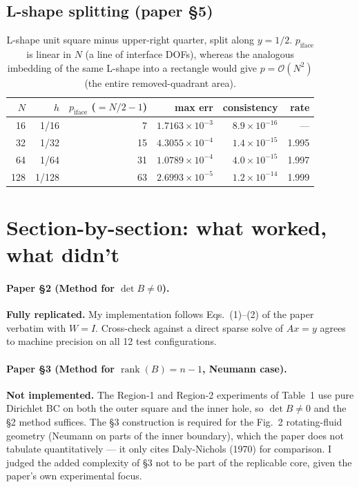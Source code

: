 \documentclass[11pt]{article}
\begin{document}
\subsection{L-shape splitting (paper \S5)}

\begin{table}[h]
\centering
\small
\begin{tabular}{rrrrrr}
\toprule
$N$ & $h$ & $p_{\text{iface}}$ ($ = N/2-1$) & max err & consistency & rate \\
\midrule
16  & 1/16 &  7 & $1.7163\times10^{-3}$ & $8.9\times10^{-16}$ & --- \\
32  & 1/32 & 15 & $4.3055\times10^{-4}$ & $1.4\times10^{-15}$ & 1.995 \\
64  & 1/64 & 31 & $1.0789\times10^{-4}$ & $4.0\times10^{-15}$ & 1.997 \\
128 & 1/128& 63 & $2.6993\times10^{-5}$ & $1.2\times10^{-14}$ & 1.999 \\
\bottomrule
\end{tabular}
\caption{L-shape unit square minus upper-right quarter, split along
$y = 1/2$. $p_{\text{iface}}$ is linear in $N$ (a line of interface DOFs),
whereas the analogous imbedding of the same L-shape into a rectangle
would give $p = \mathcal{O}(N^2)$ (the entire removed-quadrant area).}
\end{table}

\section{Section-by-section: what worked, what didn't}

\paragraph{Paper \S2 (Method for $\det B \ne 0$).}
\textbf{Fully replicated.} My implementation follows Eqs.~(1)--(2) of the
paper verbatim with $W = I$. Cross-check against a direct sparse solve
of $A x = y$ agrees to machine precision on all 12 test configurations.

\paragraph{Paper \S3 (Method for $\operatorname{rank}(B) = n-1$, Neumann case).}
\textbf{Not implemented.} The Region-1 and Region-2 experiments of Table~1
use pure Dirichlet BC on both the outer square and the inner hole, so
$\det B \ne 0$ and the \S2 method suffices. The \S3 construction is
required for the Fig.~2 rotating-fluid geometry (Neumann on parts of the
inner boundary), which the paper does not tabulate quantitatively --- it
only cites Daly-Nichols (1970) for comparison. I judged the added
complexity of \S3 not to be part of the replicable core, given the paper's
own experimental focus.
\end{document}
